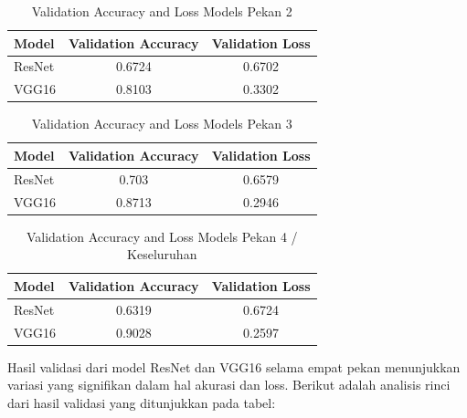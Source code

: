 \documentclass[12pt,a4paper]{article}
\begin{document}
\begin{table}[H]
\centering
\begin{tabular}{|l|c|c|}
    \hline
    \textbf{Model} & \textbf{Validation Accuracy} & \textbf{Validation Loss} \\
    \hline
    ResNet & 0.6724 & 0.6702 \\
    \hline
    VGG16 & 0.8103 & 0.3302 \\
    \hline
\end{tabular}
\caption{Validation Accuracy and Loss Models Pekan 2}
\end{table}


\begin{table}[H]
\centering
\begin{tabular}{|l|c|c|}
    \hline
    \textbf{Model} & \textbf{Validation Accuracy} & \textbf{Validation Loss} \\
    \hline
    ResNet & 0.703 & 0.6579 \\
    \hline
    VGG16 & 0.8713 & 0.2946 \\
    \hline
\end{tabular}
\caption{Validation Accuracy and Loss Models Pekan 3}
\end{table}


\begin{table}[H]
\centering
\begin{tabular}{|l|c|c|}
    \hline
    \textbf{Model} & \textbf{Validation Accuracy} & \textbf{Validation Loss} \\
    \hline
    ResNet & 0.6319 & 0.6724 \\
    \hline
    VGG16 & 0.9028 & 0.2597 \\
    \hline
\end{tabular}
\caption{Validation Accuracy and Loss Models Pekan 4 / Keseluruhan}
\end{table}


Hasil validasi dari model ResNet dan VGG16 selama empat pekan menunjukkan variasi yang signifikan dalam hal akurasi dan loss. Berikut adalah analisis rinci dari hasil validasi yang ditunjukkan pada tabel:
\end{document}
